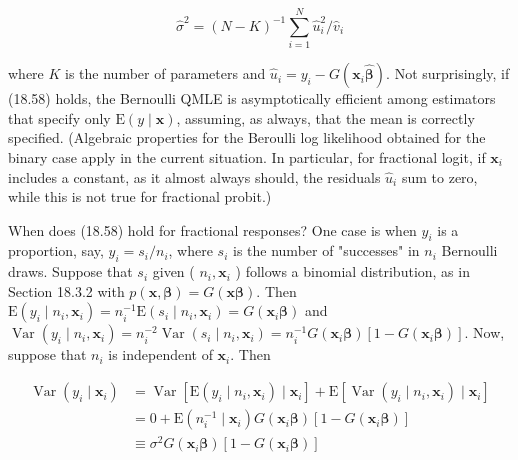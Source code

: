 \documentclass[10pt]{article}
\begin{document}
\begin{equation*}
\hat{\sigma}^{2}=(N-K)^{-1} \sum_{i=1}^{N} \hat{u}_{i}^{2} / \hat{v}_{i} \tag{18.59}
\end{equation*}


where $K$ is the number of parameters and $\hat{u}_{i}=y_{i}-G\left(\mathbf{x}_{i} \hat{\boldsymbol{\beta}}\right)$. Not surprisingly, if (18.58) holds, the Bernoulli QMLE is asymptotically efficient among estimators that specify only $\mathrm{E}(y \mid \mathbf{x})$, assuming, as always, that the mean is correctly specified. (Algebraic properties for the Beroulli log likelihood obtained for the binary case apply in the current situation. In particular, for fractional logit, if $\mathbf{x}_{i}$ includes a constant, as it almost always should, the residuals $\hat{u}_{i}$ sum to zero, while this is not true for fractional probit.)

When does (18.58) hold for fractional responses? One case is when $y_{i}$ is a proportion, say, $y_{i}=s_{i} / n_{i}$, where $s_{i}$ is the number of "successes" in $n_{i}$ Bernoulli draws. Suppose that $s_{i}$ given ( $n_{i}, \mathbf{x}_{i}$ ) follows a binomial distribution, as in Section 18.3.2 with $p(\mathbf{x}, \boldsymbol{\beta})=G(\mathbf{x} \boldsymbol{\beta})$. Then $\mathrm{E}\left(y_{i} \mid n_{i}, \mathbf{x}_{i}\right)=n_{i}^{-1} \mathrm{E}\left(s_{i} \mid n_{i}, \mathbf{x}_{i}\right)=G\left(\mathbf{x}_{i} \boldsymbol{\beta}\right)$ and $\operatorname{Var}\left(y_{i} \mid n_{i}, \mathbf{x}_{i}\right)= n_{i}^{-2} \operatorname{Var}\left(s_{i} \mid n_{i}, \mathbf{x}_{i}\right)=n_{i}^{-1} G\left(\mathbf{x}_{i} \boldsymbol{\beta}\right)\left[1-G\left(\mathbf{x}_{i} \boldsymbol{\beta}\right)\right]$. Now, suppose that $n_{i}$ is independent of $\mathbf{x}_{i}$. Then


\begin{align*}
\operatorname{Var}\left(y_{i} \mid \mathbf{x}_{i}\right) & =\operatorname{Var}\left[\mathrm{E}\left(y_{i} \mid n_{i}, \mathbf{x}_{i}\right) \mid \mathbf{x}_{i}\right]+\mathrm{E}\left[\operatorname{Var}\left(y_{i} \mid n_{i}, \mathbf{x}_{i}\right) \mid \mathbf{x}_{i}\right] \\
& =0+\mathrm{E}\left(n_{i}^{-1} \mid \mathbf{x}_{i}\right) G\left(\mathbf{x}_{i} \boldsymbol{\beta}\right)\left[1-G\left(\mathbf{x}_{i} \boldsymbol{\beta}\right)\right] \\
& \equiv \sigma^{2} G\left(\mathbf{x}_{i} \boldsymbol{\beta}\right)\left[1-G\left(\mathbf{x}_{i} \boldsymbol{\beta}\right)\right] \tag{18.60}
\end{align*}
\end{document}
